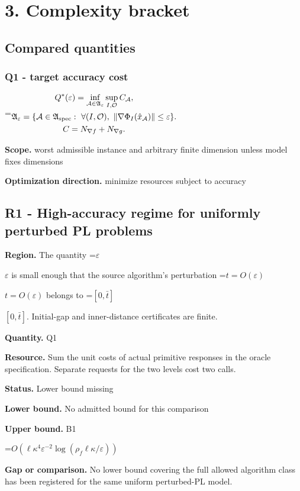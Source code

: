 \documentclass[10pt,a4paper]{article}
\newcommand{\AtlasMath}[1]{\par\begingroup\centering\setbox0=\hbox{$\displaystyle #1$}\ifdim\wd0>1.4\linewidth\typeout{ATLAS WIDE FORMULA: \the\wd0}\fi\ifdim\wd0>\linewidth\resizebox{\linewidth}{!}{\box0}\else\box0\fi\par\endgroup}
\newcommand{\AtlasInlineMath}[1]{\begingroup\setbox0=\hbox{$#1$}\ifdim\wd0>.4\linewidth\endgroup\AtlasMath{#1}\else\endgroup$#1$\fi}
\begin{document}
\section{3. Complexity bracket}
\subsection{Compared quantities}
\subsubsection{Q1 - target accuracy cost}
\AtlasMath{\begin{gathered}Q^*(\varepsilon)=\inf_{\mathcal A\in\mathfrak A_\varepsilon}\sup_{I,\mathcal O}C_{\mathcal A},\\\mathfrak A_\varepsilon=\{\mathcal A\in\mathfrak A_{\rm spec}:\ \forall(I,\mathcal O),\ \|\nabla\Phi_I(\hat x_{\mathcal A})\|\le\varepsilon\}.\\C=N_{\nabla f}+N_{\nabla g}.\end{gathered}}
\textbf{Scope.} worst admissible instance and arbitrary finite dimension unless model fixes dimensions

\textbf{Optimization direction.} minimize resources subject to accuracy

\subsection{R1 - High-accuracy regime for uniformly perturbed PL problems}
\textbf{Region.} The quantity \AtlasInlineMath{\varepsilon} is small enough that the source algorithm's perturbation \AtlasInlineMath{t=O(\varepsilon)} belongs to \AtlasInlineMath{[0,\bar t]}. Initial-gap and inner-distance certificates are finite.

\textbf{Quantity.} Q1

\textbf{Resource.} Sum the unit costs of actual primitive responses in the oracle specification. Separate requests for the two levels cost two calls.

\textbf{Status.} Lower bound missing

\textbf{Lower bound.} No admitted bound for this comparison

\textbf{Upper bound.} B1

\AtlasMath{O(\ell  \kappa ^4 \varepsilon ^{-2} \log(\rho _f \ell \kappa /\varepsilon ))}
\textbf{Gap or comparison.} No lower bound covering the full allowed algorithm class has been registered for the same uniform perturbed-PL model.
\end{document}

